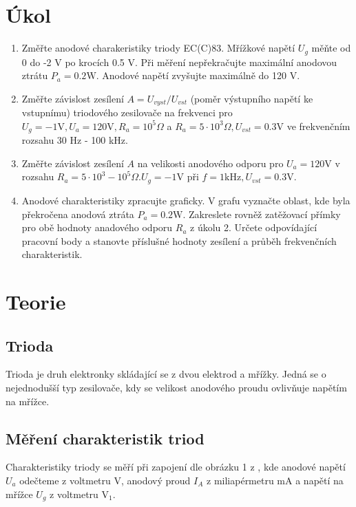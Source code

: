 \documentclass[a4paper,12pt]{article}
\begin{document}
\section{Úkol}
\noindent
\begin{enumerate}
	\item Změřte anodové charakeristiky triody EC(C)83. Mřížkové napětí $U_g$ měňte od 0 do -2 V 
    po krocích 0.5 V. Při měření nepřekračujte maximální anodovou ztrátu $P_a = 0.2 \mbox{W}$.
    Anodové napětí zvyšujte maximálně do 120 V.
	\item Změřte závislost zesílení $A = U_{vyst}/U_{vst}$ (poměr výstupního napětí ke vstupnímu) 
    triodového zesilovače na frekvenci pro $U_g = -1 \mbox{V}, U_a = 120 \mbox{V}, R_a=10^5 \Omega$ 
    a $R_a = 5\cdot 10^3 \Omega, U_{vst} = 0.3 \mbox{V}$ ve frekvenčním rozsahu 30 Hz - 100 kHz.
	\item Změřte závislost zesílení $A$ na velikosti anodového odporu pro $U_a = 120 \mbox{V}$ v
    rozsahu $R_a = 5 \cdot 10^3 - 10^5 \Omega. U_g = -1 \mbox{V}$ při $f = 1 \mbox{kHz}, U_{vst}=0.3 \mbox{V}$.
	\item Anodové charakteristiky zpracujte graficky. V grafu vyznačte oblast, kde byla překročena 
    anodová ztráta $P_a = 0.2 \mbox{W}.$ Zakreslete rovněž zatěžovací přímky pro obě hodnoty anadového 
    odporu $R_a$ z úkolu 2. Určete odpovídající pracovní body a stanovte příslušné hodnoty zesílení a průběh 
    frekvenčních charakteristik.
\end{enumerate}

\section{Teorie}

\subsection{Trioda}
Trioda je druh elektronky skládající se z dvou elektrod a mřížky. Jedná se o nejednodušší typ zesilovače, 
kdy se velikost anodového proudu ovlivňuje napětím na mřížce. 

\subsection{Měření charakteristik triod}
Charakteristiky triody se měří při zapojení dle obrázku 1 z \cite{text}, kde anodové napětí $U_a$ odečteme 
z voltmetru V, anodový proud $I_A$ z miliapérmetru mA a napětí na mřížce $U_g$ z voltmetru V$_1$.
\end{document}
